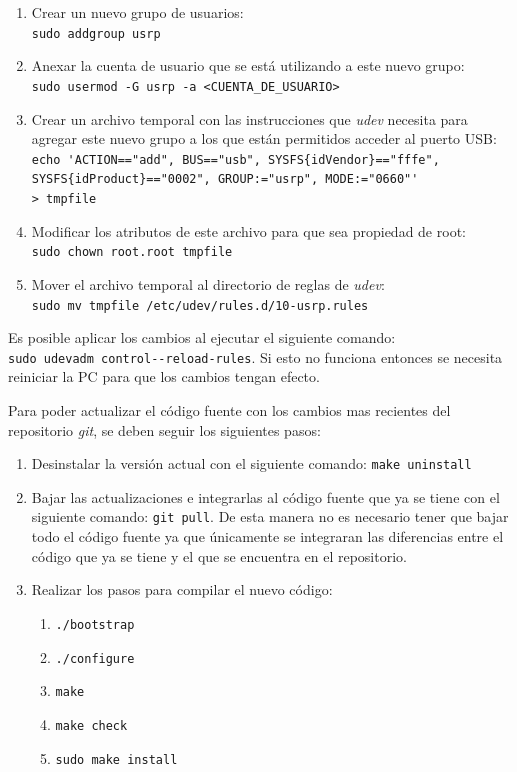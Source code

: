 \begin{enumerate}
  \item Crear un nuevo grupo de usuarios:\\
  \verb|sudo addgroup usrp|
  \item Anexar la cuenta de usuario que se est\'a utilizando a este nuevo
  grupo:\\
  \verb|sudo usermod -G usrp -a <CUENTA_DE_USUARIO>|
  \item Crear un archivo temporal con las instrucciones que \emph{udev} necesita
  para agregar este nuevo grupo a los que est\'an permitidos acceder al puerto
  USB:\\
  \verb|echo 'ACTION=="add", BUS=="usb", SYSFS{idVendor}=="fffe",|\\
  \verb|SYSFS{idProduct}=="0002", GROUP:="usrp", MODE:="0660"'|\\
  \verb|> tmpfile|
  \item Modificar los atributos de este archivo para que sea propiedad de root:\\
  \verb|sudo chown root.root tmpfile|
  \item Mover el archivo temporal al directorio de reglas de \emph{udev}:\\
  \verb|sudo mv tmpfile /etc/udev/rules.d/10-usrp.rules|
\end{enumerate}

Es posible aplicar los cambios al ejecutar el siguiente comando:\\
\verb|sudo udevadm control--reload-rules|. Si esto no funciona entonces se necesita reiniciar la PC
para que los cambios tengan efecto.

Para poder actualizar el c\'odigo fuente con los cambios mas recientes del repositorio \emph{git}, se deben seguir los siguientes
pasos:

\begin{enumerate}
  \item Desinstalar la versi\'on actual con el siguiente comando: \verb|make uninstall|
  \item Bajar las actualizaciones e integrarlas al c\'odigo fuente que ya se tiene con el siguiente comando:
  \verb|git pull|. De esta manera no es necesario tener que bajar todo el c\'odigo fuente ya que \'unicamente se integraran las
  diferencias entre el c\'odigo que ya se tiene y el que se encuentra en el repositorio.
  \item Realizar los pasos para compilar el nuevo c\'odigo:
  \begin{enumerate}
    \item \verb|./bootstrap|
    \item \verb|./configure|
    \item \verb|make|
    \item \verb|make check|
    \item \verb|sudo make install|
   \end{enumerate}
\end{enumerate}

